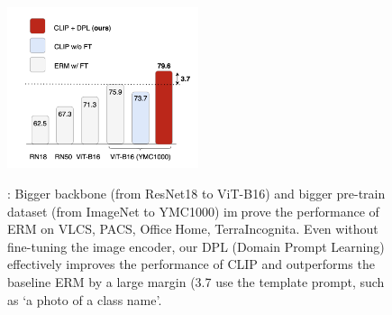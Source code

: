 \documentclass{article}
\begin{document}
\begin{multicols}{2}
\begin{figure}[H]
         \centering
         \includegraphics[width=0.5\textwidth]{1.png}
         \label{fig:three sin x}
         \caption{: Bigger backbone (from ResNet18 to ViT-B16) and
bigger pre-train dataset (from ImageNet to YMC1000) improve the performance of ERM on VLCS, PACS, OfficeHome, TerraIncognita. Even without fine-tuning the image
encoder, our DPL (Domain Prompt Learning) effectively
improves the performance of CLIP and outperforms the
baseline ERM by a large margin (3.7%
use the template prompt, such as ‘a photo of a {class name}’.
}
\end{figure}


\end{multicols}
\end{document}
